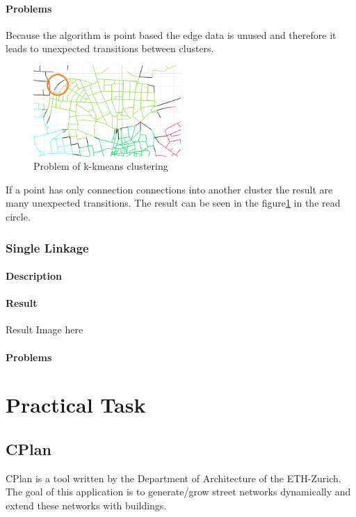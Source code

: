 \documentclass[11pt, a4paper]{report}
\begin{document}
\subsubsection{Problems}
Because the algorithm is point based the edge data is unused and therefore it leads to unexpected transitions between clusters.
\begin{figure}[!h]
    \centering
    \includegraphics[width=0.5\textwidth]{clusteranalysis_kmeans_problem.png}
    \caption{Problem of k-kmeans clustering\label{fig:KmeansProblem}}
\end{figure}
\newline
If a point has only connection connections into another cluster the result are many unexpected transitions. The result can be seen in the figure\ref{fig:KmeansProblem} in the read circle. 

\pagebreak
\subsection{Single Linkage}
\subsubsection{Description}

\subsubsection{Result}
Result Image here

\subsubsection{Problems}

\pagebreak
\chapter{Practical Task}
\section{CPlan}\label{CPlan}
CPlan is a tool written by the Department of Architecture of the ETH-Zurich. The goal of this application is to generate/grow street networks dynamically and extend these networks with buildings. 
\end{document}
